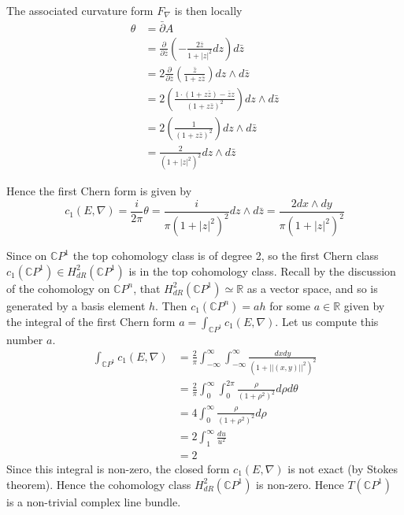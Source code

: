 \documentclass[a4paper]{article}
\theoremstyle{definition} \newtheorem*{definition}{Definition}
\theoremstyle{definition} \newtheorem*{definitions}{Definitions}
\theoremstyle{plain} \newtheorem{theorem}{Theorem}[section]
\theoremstyle{plain} \newtheorem{proposition}[theorem]{Proposition}
\theoremstyle{plain} \newtheorem{corollary}[theorem]{Corollary}
\theoremstyle{plain} \newtheorem{lemma}[theorem]{Lemma}
\theoremstyle{plain} \newtheorem{example}[theorem]{Example}
\newcommand{\realnos}{\mathbb{R}}
\newcommand{\complexnos}{\mathbb{C}}
\begin{document}
The associated curvature form $F_\nabla$ is then locally
\begin{align*}
\theta & = \bar{\partial} A \\
& = \frac{\partial}{\partial \bar{z}} \left( -\frac{2\bar{z}}{1+|z|^2} dz \right) d\bar{z} \\
& = 2 \frac{\partial}{\partial \bar{z}} \left(\frac{\bar{z}}{1+z\bar{z}} \right) dz\wedge d\bar{z} \\
& = 2 \left(\frac{1\cdot (1+z\bar{z})-\bar{z}z}{(1+z\bar{z})^2} \right) dz\wedge d\bar{z} \\
& = 2 \left(\frac{1}{(1+z\bar{z})^2} \right) dz\wedge d\bar{z} \\
& = \frac{2}{(1+|z|^2)^2} dz \wedge d\bar{z}
\end{align*}


Hence the first Chern form is given by 
$$c_1(E, \nabla) = \frac{i}{2\pi} \theta = \frac{i}{\pi(1+|z|^2)^2} dz \wedge d\bar{z} = \frac{2dx\wedge dy}{\pi(1+|z|^2)^2}$$

Since on $\complexnos P^1$ the top cohomology class is of degree 2, so the first Chern class $c_1(\complexnos P^1)\in H^2_{dR}(\complexnos P^1)$ is in the top cohomology class. Recall by the discussion of the cohomology on $\complexnos P^n$, that $H^2_{dR}(\complexnos P^1)\simeq \realnos$ as a vector space, and so is generated by a basis element $h$. Then $c_1(\complexnos P^n) = ah$ for some $a\in \realnos$ given by the integral of the first Chern form $a=\int_{\complexnos P^1} c_1(E, \nabla)$. Let us compute this number $a$.
\begin{align*}
    \int_{\complexnos P^1} c_1(E, \nabla) & =  \frac{2}{\pi} \int_{-\infty}^\infty \int_{-\infty}^\infty \frac{dx dy}{(1+||(x,y)||^2)^2} \\
    & = \frac{2}{\pi} \int_{0}^\infty \int_{0}^{2\pi} \frac{\rho}{(1+\rho^2)^2} d\rho d\theta \\
    & = 4 \int_{0}^\infty \frac{\rho}{(1+\rho^2)^2} d\rho  \\
    & = 2 \int_{1}^\infty \frac{du}{u^2}  \\
    & = 2
\end{align*}
Since this integral is non-zero, the closed form $c_1(E,\nabla)$ is not exact (by Stokes theorem). Hence the cohomology class $H^2_{dR}(\complexnos P^1)$ is non-zero. Hence $T(\complexnos P^1)$ is a non-trivial complex line bundle. 
\end{document}
